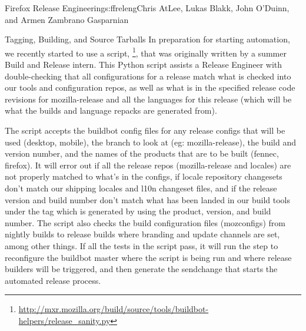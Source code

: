 \begin{aosachapter}{Firefox Release Engineering}{s:ffreleng}{Chris AtLee, Lukas Blakk, John O'Duinn, and Armen Zambrano Gasparnian}
\begin{aosasect1}{Tagging, Building, and Source Tarballs}
In preparation for starting automation, we recently started to use a
script,
\footnote{\url{http://mxr.mozilla.org/build/source/tools/buildbot-helpers/release_sanity.py}}, 
that was originally written by a summer Build and Release intern. This
Python script assists a Release Engineer with double-checking that
all configurations for a release match what is checked into our tools
and configuration repos, as well as what is in the specified release
code revisions for mozilla-release and all the languages for this
release (which will be what the builds and language repacks are
generated from).



The script accepts the buildbot config files for any release configs
that will be used (desktop, mobile), the branch to look at (eg:
mozilla-release), the build and version number, and the names of the
products that are to be built (fennec, firefox). It will error out if
all the release repos (mozilla-release and locales) are not properly
matched to what's in the configs, if locale repository changesets don't
match our shipping locales and l10n changeset files, and if the
release version and build number don't match what has been landed in
our build tools under the tag which is generated by using the product,
version, and build number. The script also checks the build
configuration files (mozconfigs) from nightly builds to release builds
where branding and update channels are set, among other things. If all
the tests in the script pass, it will run the step to reconfigure the
buildbot master where the script is being run and where release
builders will be triggered, and then generate the sendchange that
starts the automated release process.


\end{aosasect1}
\end{aosachapter}

